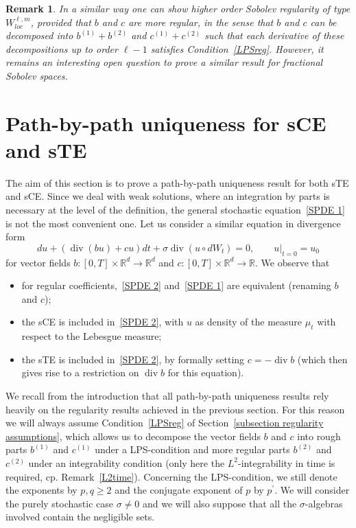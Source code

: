 \documentclass[a4paper,10pt]{article}
\newtheorem{remark}[theorem]{Remark}
\begin{document}
\begin{remark}
In a similar way one can show higher order Sobolev regularity of type $W^{\ell,m}_{loc}$, provided that $b$ and $c$ are more regular, in the sense that $b$ and $c$ can be decomposed into $b^{(1)}+b^{(2)}$ and $c^{(1)}+c^{(2)}$ such that each derivative of these decompositions up to order $\ell-1$ satisfies Condition~\ref{LPSreg}. However, it remains an interesting open question to prove a similar result for fractional Sobolev spaces.
\end{remark}

\section{Path-by-path uniqueness for sCE and sTE}\label{pbp_section}

The aim of this section is to prove a path-by-path uniqueness result for both
sTE and sCE. Since we deal with weak solutions, where an integration by parts
is necessary at the level of the definition, the general stochastic equation~\eqref{SPDE 1} is not the most convenient one. Let us consider a similar equation 
in divergence form
\begin{equation}
du+ (  \operatorname{div}(bu)  +cu )  dt+\sigma
\operatorname{div} (  u\circ dW_{t})  =0,\qquad u|_{t=0}=u_{0}
\label{SPDE 2}
\end{equation}
for vector fields $b \colon [0,T] \times \mathbb{R}^d \to \mathbb{R}^d$ and $c \colon   [0,T] \times \mathbb{R}^d \to \mathbb{R}$. We observe that
\begin{itemize}
  \item[i)] for regular coefficients,~\eqref{SPDE 2} and~\eqref{SPDE 1} are equivalent (renaming $b$ and $c$);
  \item[ii)] the sCE is included in~\eqref{SPDE 2}, with $u$ as density of the measure $\mu_t$ with respect to the Lebesgue measure;
  \item[iii)] the sTE is included in~\eqref{SPDE 2}, by formally setting $c=-\operatorname{div}b$ (which then gives rise to a restriction  on $\operatorname{div}b$ for this equation).
\end{itemize}

We recall from the introduction that all path-by-path uniqueness results rely heavily on the regularity results achieved in the previous section. For this reason we will always assume Condition~\ref{LPSreg} of Section~\ref{subsection regularity assumptions}, which allows us to decompose the vector fields $b$ and $c$ into rough parts $b^{(1)}$ and $c^{(1)}$ under a LPS-condition and more regular parts $b^{(2)}$ and $c^{(2)}$ under an integrability condition (only here the $L^2$-integrability in time is required, cp. Remark~\ref{L2time}). Concerning the LPS-condition, we still denote the exponents by $p,q \geq 2$ and the conjugate exponent of $p$ by $p^{\prime}$. We will consider the purely stochastic case $\sigma\neq0$ and we will also suppose that all the $\sigma$-algebras involved contain the negligible sets.
\end{document}
